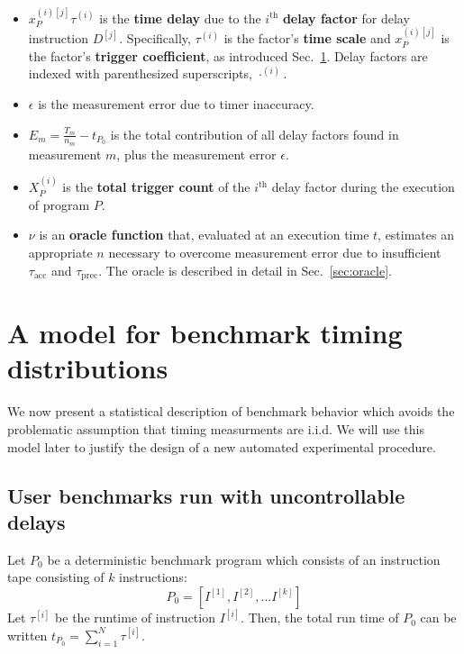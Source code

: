 \documentclass[conference]{IEEEtran}
\begin{document}
\begin{itemize}
    \item
    $x_P^{(i)[j]} \tau^{(i)}$ is the \textbf{time delay} due to the
    $i^{\textrm{th}}$ \textbf{delay factor} for delay instruction $D^{[j]}$.  Specifically,
    $\tau^{(i)}$ is the factor's \textbf{time scale} and $x_P^{(i)[j]}$ is the factor's
    \textbf{trigger coefficient}, as introduced Sec.~\ref{sec:model}. Delay factors are indexed with  parenthesized
    superscripts, $\cdot^{(i)}$.

    \item
    $\epsilon$ is the measurement error due to timer inaccuracy.

    \item
    $E_m = \frac{T_m}{n_m} - t_{P_0}$ is the total contribution of all delay
factors found in measurement $m$, plus the measurement error $\epsilon$.

    \item
    $X^{(i)}_P$ is the \textbf{total trigger count} of the $i^{\textrm{th}}$
    delay factor during the execution of program $P$.

    \item
    $\nu$ is an \textbf{oracle function} that, evaluated at an execution time
$t$, estimates an appropriate $n$ necessary to overcome measurement error due
to insufficient
    $\tau_{\textrm{acc}}$ and $\tau_{\textrm{prec}}$. The oracle is described in detail in Sec.~\ref{sec:oracle}.
\end{itemize}

\section{A model for benchmark timing distributions}
\label{sec:model}

We now present a statistical description of benchmark behavior which avoids the problematic
assumption that timing measurments are i.i.d. We will use this model later to justify the
design of a new automated experimental procedure.

\subsection{User benchmarks run with uncontrollable delays}
\label{sec:programmodel}

Let $P_0$ be a deterministic benchmark program which consists of an instruction tape
consisting of $k$ instructions:
%
\begin{equation}
    P_0 = \left[I^{[1]}, I^{[2]}, \dots I^{[k]}\right]
\end{equation}
%
Let $\tau^{[i]}$ be the runtime of instruction $I^{[i]}$. Then, the total run
time of $P_0$ can be written $t_{P_0} = \sum_{i=1}^N \tau^{[i]}$.
\end{document}
